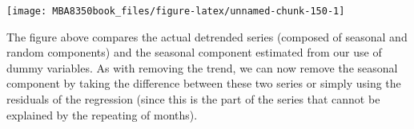 \documentclass[
]{book}
\newenvironment{Shaded}{\begin{snugshade}}{\end{snugshade}}
\newcommand{\AttributeTok}[1]{\textcolor[rgb]{0.77,0.63,0.00}{#1}}
\newcommand{\ConstantTok}[1]{\textcolor[rgb]{0.00,0.00,0.00}{#1}}
\newcommand{\DecValTok}[1]{\textcolor[rgb]{0.00,0.00,0.81}{#1}}
\newcommand{\FunctionTok}[1]{\textcolor[rgb]{0.00,0.00,0.00}{#1}}
\newcommand{\NormalTok}[1]{#1}
\newcommand{\OtherTok}[1]{\textcolor[rgb]{0.56,0.35,0.01}{#1}}
\newcommand{\SpecialCharTok}[1]{\textcolor[rgb]{0.00,0.00,0.00}{#1}}
\newcommand{\StringTok}[1]{\textcolor[rgb]{0.31,0.60,0.02}{#1}}
\begin{document}
\begin{Shaded}
\end{Shaded}

\begin{center}\texttt{[image: MBA8350book\_files/figure-latex/unnamed-chunk-150-1]} \end{center}

The figure above compares the actual detrended series (composed of seasonal and random components) and the seasonal component estimated from our use of dummy variables. As with removing the trend, we can now remove the seasonal component by taking the difference between these two series or simply using the residuals of the regression (since this is the part of the series that cannot be explained by the repeating of months).
\end{document}
